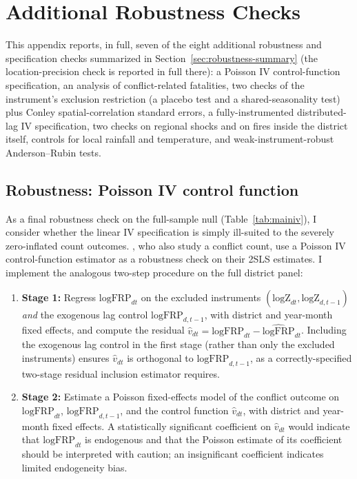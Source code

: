 \documentclass[12pt]{article}
\begin{document}
\section{Additional Robustness Checks}
\label{sec:appendixrobustness}

This appendix reports, in full, seven of the eight additional robustness and specification checks summarized in Section~\ref{sec:robustness-summary} (the location-precision check is reported in full there): a Poisson IV control-function specification, an analysis of conflict-related fatalities, two checks of the instrument's exclusion restriction (a placebo test and a shared-seasonality test) plus Conley spatial-correlation standard errors, a fully-instrumented distributed-lag IV specification, two checks on regional shocks and on fires inside the district itself, controls for local rainfall and temperature, and weak-instrument-robust Anderson--Rubin tests.

\subsection{Robustness: Poisson IV control function}
\label{sec:poisson}

As a final robustness check on the full-sample null (Table~\ref{tab:mainiv}), I consider whether the linear IV specification is simply ill-suited to the severely zero-inflated count outcomes. \citet{lu2023fish}, who also study a conflict count, use a Poisson IV control-function estimator \citep{terzabasurathouz2008} as a robustness check on their 2SLS estimates. I implement the analogous two-step procedure on the full district panel:

\begin{enumerate}
    \item \textbf{Stage 1:} Regress $\text{logFRP}_{dt}$ on the excluded instruments $(\text{logZ}_{dt}, \text{logZ}_{d,t-1})$ \emph{and} the exogenous lag control $\text{logFRP}_{d,t-1}$, with district and year-month fixed effects, and compute the residual $\hat{v}_{dt} = \text{logFRP}_{dt} - \widehat{\text{logFRP}}_{dt}$. Including the exogenous lag control in the first stage (rather than only the excluded instruments) ensures $\hat{v}_{dt}$ is orthogonal to $\text{logFRP}_{d,t-1}$, as a correctly-specified two-stage residual inclusion estimator requires.
    \item \textbf{Stage 2:} Estimate a Poisson fixed-effects model of the conflict outcome on $\text{logFRP}_{dt}$, $\text{logFRP}_{d,t-1}$, and the control function $\hat{v}_{dt}$, with district and year-month fixed effects. A statistically significant coefficient on $\hat{v}_{dt}$ would indicate that $\text{logFRP}_{dt}$ is endogenous and that the Poisson estimate of its coefficient should be interpreted with caution; an insignificant coefficient indicates limited endogeneity bias.
\end{enumerate}
\end{document}
